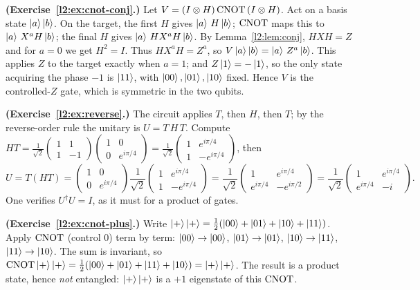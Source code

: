 \begin{solution}
\textbf{(Exercise~\ref{l2:ex:cnot-conj}.)} Let $V=(I\otimes H)\,\mathrm{CNOT}\,(I\otimes H)$.
Act on a basis state $\ket{a}\ket{b}$. On the target, the first $H$ gives
$\ket{a}\,H\ket{b}$; $\mathrm{CNOT}$ maps this to $\ket{a}\,X^{a}H\ket{b}$; the final $H$
gives $\ket{a}\,H X^{a} H\ket{b}$. By Lemma~\ref{l2:lem:conj}, $HX H=Z$ and for
$a=0$ we get $H^{2}=I$. Thus $HX^{a}H=Z^{a}$, so
$V\ket{a}\ket{b}=\ket{a}\,Z^{a}\ket{b}$. This applies $Z$ to the target exactly
when $a=1$; and $Z\ket{1}=-\ket{1}$, so the only state acquiring the phase $-1$
is $\ket{11}$, with $\ket{00},\ket{01},\ket{10}$ fixed. Hence $V$ is the
controlled-$Z$ gate, which is symmetric in the two qubits.
\end{solution}

\begin{solution}
\textbf{(Exercise~\ref{l2:ex:reverse}.)} The circuit applies $T$, then $H$, then
$T$; by the reverse-order rule the unitary is $U=T\,H\,T$. Compute
$HT=\tfrac{1}{\sqrt2}\left(\begin{smallmatrix}1&1\\1&-1\end{smallmatrix}\right)
\left(\begin{smallmatrix}1&0\\0&e^{i\pi/4}\end{smallmatrix}\right)
=\tfrac{1}{\sqrt2}\left(\begin{smallmatrix}1&e^{i\pi/4}\\1&-e^{i\pi/4}\end{smallmatrix}\right)$,
then
\[
  U=T(HT)=\begin{pmatrix}1&0\\0&e^{i\pi/4}\end{pmatrix}
     \frac{1}{\sqrt2}\begin{pmatrix}1&e^{i\pi/4}\\1&-e^{i\pi/4}\end{pmatrix}
   =\frac{1}{\sqrt2}\begin{pmatrix}1&e^{i\pi/4}\\ e^{i\pi/4}&-e^{i\pi/2}\end{pmatrix}
   =\frac{1}{\sqrt2}\begin{pmatrix}1&e^{i\pi/4}\\ e^{i\pi/4}&-i\end{pmatrix}.
\]
One verifies $U^{\dagger}U=I$, as it must for a product of gates.
\end{solution}

\begin{solution}
\textbf{(Exercise~\ref{l2:ex:cnot-plus}.)} Write
$\ket{+}\ket{+}=\tfrac12(\ket{00}+\ket{01}+\ket{10}+\ket{11})$. Apply
$\mathrm{CNOT}$ (control $0$) term by term: $\ket{00}\to\ket{00}$,
$\ket{01}\to\ket{01}$, $\ket{10}\to\ket{11}$, $\ket{11}\to\ket{10}$. The sum is
invariant, so
$\mathrm{CNOT}\ket{+}\ket{+}=\tfrac12(\ket{00}+\ket{01}+\ket{11}+\ket{10})=\ket{+}\ket{+}$.
The result is a product state, hence \emph{not} entangled: $\ket{+}\ket{+}$ is a
$+1$ eigenstate of this $\mathrm{CNOT}$.
\end{solution}

